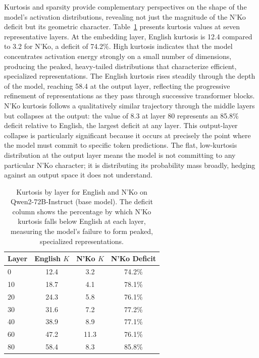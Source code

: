 \documentclass[11pt]{article}
\newcommand{\nko}{N'Ko}
\begin{document}
Kurtosis and sparsity provide complementary perspectives on the shape of the model's activation distributions, revealing not just the magnitude of the \nko{} deficit but its geometric character. Table~\ref{tab:kurtosis} presents kurtosis values at seven representative layers. At the embedding layer, English kurtosis is 12.4 compared to 3.2 for \nko{}, a deficit of 74.2\%. High kurtosis indicates that the model concentrates activation energy strongly on a small number of dimensions, producing the peaked, heavy-tailed distributions that characterize efficient, specialized representations. The English kurtosis rises steadily through the depth of the model, reaching 58.4 at the output layer, reflecting the progressive refinement of representations as they pass through successive transformer blocks. \nko{} kurtosis follows a qualitatively similar trajectory through the middle layers but collapses at the output: the value of 8.3 at layer 80 represents an 85.8\% deficit relative to English, the largest deficit at any layer. This output-layer collapse is particularly significant because it occurs at precisely the point where the model must commit to specific token predictions. The flat, low-kurtosis distribution at the output layer means the model is not committing to any particular \nko{} character; it is distributing its probability mass broadly, hedging against an output space it does not understand.

\begin{table}[ht]
\centering
\caption{Kurtosis by layer for English and \nko{} on Qwen2-72B-Instruct (base model). The deficit column shows the percentage by which \nko{} kurtosis falls below English at each layer, measuring the model's failure to form peaked, specialized representations.}
\label{tab:kurtosis}
\begin{tabular}{@{}lccc@{}}
\toprule
Layer & English $K$ & \nko{} $K$ & \nko{} Deficit \\
\midrule
0 & 12.4 & 3.2 & 74.2\% \\
10 & 18.7 & 4.1 & 78.1\% \\
20 & 24.3 & 5.8 & 76.1\% \\
30 & 31.6 & 7.2 & 77.2\% \\
40 & 38.9 & 8.9 & 77.1\% \\
60 & 47.2 & 11.3 & 76.1\% \\
80 & 58.4 & 8.3 & 85.8\% \\
\bottomrule
\end{tabular}
\end{table}
\end{document}
